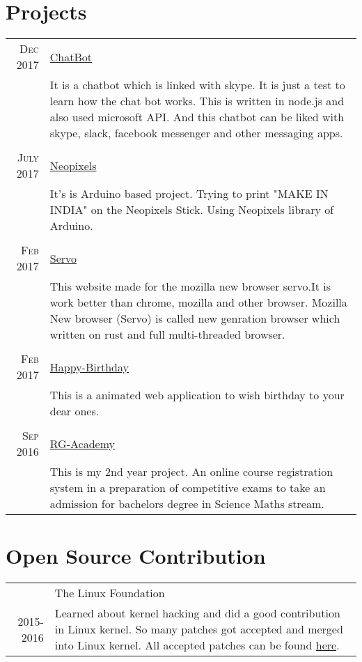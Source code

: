 \documentclass[a4paper,10pt]{article}
\begin{document}
\section{Projects}
\begin{tabular}{r|p{11cm}}
 
 \textsc{Dec 2017} &  \href{https://github.com/AnchalJain/careBOT}{ChatBot} \\&\footnotesize{It is a chatbot which is linked with skype. It is just a test to learn how the chat bot works. This is written in node.js and also used microsoft API. And this chatbot can be liked with skype, slack, facebook messenger and other messaging apps.}\\\multicolumn{2}{c}{} \\
\textsc{July 2017} & \href{https://github.com/AnchalJain/Neopixels}{Neopixels} \\&\footnotesize{It's is Arduino based project. Trying to print "MAKE IN INDIA" on the Neopixels Stick. Using Neopixels library of Arduino. }\\\multicolumn{2}{c}{} \\
\textsc{Feb 2017} & \href{https://github.com/AnchalJain/Demo-project}{Servo} \\&\footnotesize{This website made for the mozilla new browser servo.It is work better than chrome,
mozilla and other browser. Mozilla New browser (Servo) is called new genration browser which written on rust and full multi-threaded browser.}\\\multicolumn{2}{c}{} \\
\textsc{Feb 2017} & \href{https://github.com/AnchalJain/Happy-Birthday}{Happy-Birthday} \\&\footnotesize{This is a animated web application to wish birthday to your dear ones.}\\\multicolumn{2}{c}{} \\
\textsc{Sep 2016} & \href{https://github.com/AnchalJain/RG-Academy}{RG-Academy} \\&\footnotesize{This is my 2nd year project. An online course registration system in a preparation of competitive exams to take an admission for bachelors degree in Science Maths stream.}

\end{tabular}

\section{Open Source Contribution}
\begin{tabular}{r|p{11cm}}
 \ & The Linux Foundation \\\textsc{2015-2016} &\footnotesize{Learned about kernel hacking and did a good contribution in Linux kernel.
So many patches got accepted and merged into Linux kernel. All accepted patches can be found \href{https://git.kernel.org/cgit/linux/kernel/git/next/linux-next.git/log/?qt=grep&q=Anchal+Jain}{here}.}
\end{tabular}
\end{document}
